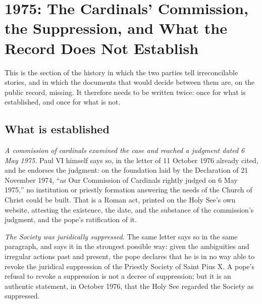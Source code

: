 \section{1975: The Cardinals' Commission, the Suppression, and What the
Record Does Not Establish}

This is the section of the history in which the two parties tell
irreconcilable stories, and in which the documents that would decide
between them are, on the public record, missing. It therefore needs to be
written twice: once for what is established, and once for what is not.

\subsection{What is established}

\emph{A commission of cardinals examined the case and reached a judgment
dated 6 May 1975.} Paul VI himself says so, in the letter of 11 October
1976 already cited, and he endorses the judgment: on the foundation laid
by the Declaration of 21 November 1974, ``as Our Commission of Cardinals
rightly judged on 6 May 1975,'' no institution or priestly formation
answering the needs of the Church of Christ could be
built. That is a Roman act, printed on the Holy See's own website,
attesting the existence, the date, and the substance of the commission's
judgment, and the pope's ratification of it.

\emph{The Society was juridically suppressed.} The same letter says so in
the same paragraph, and says it in the strongest possible way: given the
ambiguities and irregular actions past and present, the pope declares
that he is in no way able to revoke the juridical suppression of the
Priestly Society of Saint Pius X. A pope's refusal to revoke a
suppression is not a decree of suppression; but it is an authentic
statement, in October 1976, that the Holy See regarded the Society as
suppressed.

